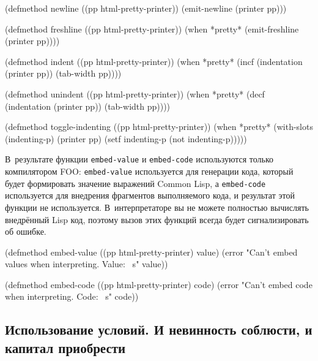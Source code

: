 \begin{myverb}
(defmethod newline ((pp html-pretty-printer))
  (emit-newline (printer pp)))

(defmethod freshline ((pp html-pretty-printer))
  (when *pretty* (emit-freshline (printer pp))))

(defmethod indent ((pp html-pretty-printer))
  (when *pretty* 
    (incf (indentation (printer pp)) (tab-width pp))))

(defmethod unindent ((pp html-pretty-printer))
  (when *pretty* 
    (decf (indentation (printer pp)) (tab-width pp))))

(defmethod toggle-indenting ((pp html-pretty-printer))
  (when *pretty* 
    (with-slots (indenting-p) (printer pp)
      (setf indenting-p (not indenting-p)))))
\end{myverb}

В~результате функции \lstinline{embed-value} и \lstinline{embed-code} используются только
компилятором FOO: \lstinline{embed-value} используется для генерации кода, который будет
формировать значение выражений Common Lisp, а \lstinline{embed-code} используется для
внедрения фрагментов выполняемого кода, и результат этой функции не используется.
В~интерпретаторе вы не можете полностью вычислять внедрённый Lisp код, поэтому вызов этих
функций всегда будет сигнализировать об ошибке.

\begin{myverb}
(defmethod embed-value ((pp html-pretty-printer) value)
  (error "Can't embed values when  interpreting. Value: ~s" value))

(defmethod embed-code ((pp html-pretty-printer) code)
  (error "Can't embed code when interpreting. Code: ~s" code))
\end{myverb}


\subsection[Использование условий. И невинность соблюсти, и капитал приобрести]{Использование условий. И невинность соблюсти, и капитал приобрести}

